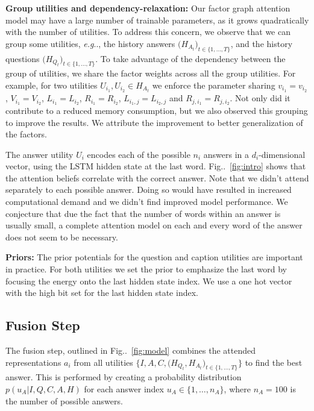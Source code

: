 \documentclass[10pt,twocolumn,letterpaper]{article}
\makeatletter
\def\@onedot{\ifx\@let@token.\else.\null\fi\xspace}
\DeclareRobustCommand\onedot{\futurelet\@let@token\@onedot}
\newcommand{\figref}[1]{Fig\onedot~\ref{#1}}
\def\eg{\emph{e.g}\onedot} \def\Eg{\emph{E.g}\onedot}
\makeatother
\begin{document}
\noindent\textbf{Group utilities and dependency-relaxation:} Our factor graph attention model may have a large number of trainable parameters, as it grows quadratically with the number of utilities. To address this concern, we observe that we can group some utilities, \eg, the history answers $\big( H_{A_t} \big)_{t\in\{1, \ldots, T\}}$, and the history questions $\big( H_{Q_t} \big)_{t\in\{1, \ldots, T\}}$. To take advantage of the dependency between the group of utilities, we share the factor weights across all the group utilities. For example, for two utilities $U_{i_1}, U_{i_2} \in H_{A_t}$ we enforce the parameter sharing $v_{i_1} = v_{i_2}$, $V_{i_1} = V_{i_2}$, $L_{i_1} = L_{i_2}$, $R_{i_1} = R_{i_2}$, $L_{i_1,j} = L_{i_2,j}$ and $R_{j,i_1} = R_{j,i_2}$. Not only did it contribute to a reduced memory consumption, but we  also observed this grouping to improve the results. We  attribute the improvement to better generalization of the factors. 

The answer utility $U_i$ encodes each of the possible $n_i$ answers in a $d_i$-dimensional vector, using the LSTM hidden state at the last word. \figref{fig:intro} shows that the attention beliefs correlate with the correct answer. Note that we didn't attend separately to each possible answer. Doing so 
would have resulted in increased computational demand and we didn't find improved  model performance. We conjecture that due the fact that the number of words within an answer is usually small, a complete attention model on each and every word of the answer does not seem to be necessary. 



\noindent\textbf{Priors:} The prior potentials for the question and caption utilities are important in practice. For both utilities we set the prior to emphasize the last word by focusing the energy onto the last hidden state index.  We use a one hot vector with the high bit set for the last hidden state index. 









\subsection{Fusion Step}
\label{sec:fusion}






The fusion step, outlined in \figref{fig:model} combines the attended representations $a_i$ from all  utilities $\{I,A,C,\big( H_{Q_t}, H_{A_t}\big)_{t\in\{1, \ldots, T\}}\}$ to find the best answer. This is performed by creating a probability distribution $ p( u_A | I,Q,C,A,H) $ for each answer index $u_A \in\{ 1,\ldots,n_A\}$, where $n_A = 100$ is the number of possible answers. 
\end{document}
